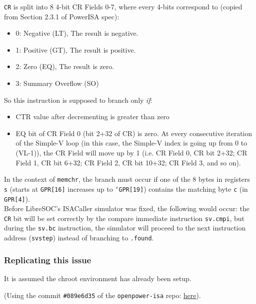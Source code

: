 \texttt{CR} is split into 8 4-bit CR Fields 0-7, where every 4-bits correspond
to (copied from Section 2.3.1 of PowerISA spec):

\begin{itemize}
  \item 0: Negative (LT), The result is negative.
  \item 1: Positive (GT), The result is positive.
  \item 2: Zero (EQ), The result is zero.
  \item 3: Summary Overflow (SO)
\end{itemize}

So this instruction is supposed to branch only \textit{if}:

\begin{itemize}
  \item CTR value after decrementing is greater than zero
  \item EQ bit of CR Field 0 (bit 2+32 of CR) is zero.
At every consecutive iteration of the Simple-V loop (in this case,
the Simple-V index is going up from 0 to (VL-1)), the CR Field will move up
by 1 (i.e. CR Field 0, CR bit 2+32; CR Field 1, CR bit 6+32;
CR Field 2, CR bit 10+32; CR Field 3, and so on).
\end{itemize}

In the context of \texttt{memchr}, the branch must occur if one of the 8 bytes
in registers \texttt{s} (starts at \texttt{GPR[16]} increases up to
\texttt{`GPR[19]}) contains the matching byte \texttt{c}
(in \texttt{GPR[4]}).\\

Before LibreSOC's ISACaller simulator was fixed, the following would occur:
the \texttt{CR} bit will be set correctly by the compare immediate instruction
\texttt{sv.cmpi}, but during the \texttt{sv.bc} instruction, the simulator
will proceed to the next instruction address (\texttt{svstep})
instead of branching to \texttt{.found}.

\subsubsection{Replicating this issue}

It is assumed the chroot environment has already been setup.

(Using the commit \texttt{\#089e6d35} of the \texttt{openpower-isa} repo:
\href{https://git.libre-soc.org/?p=openpower-isa.git;a=commitdiff;h=089e6d352ec57be4ab645d18ad9e95df3af0d365}{here}).

